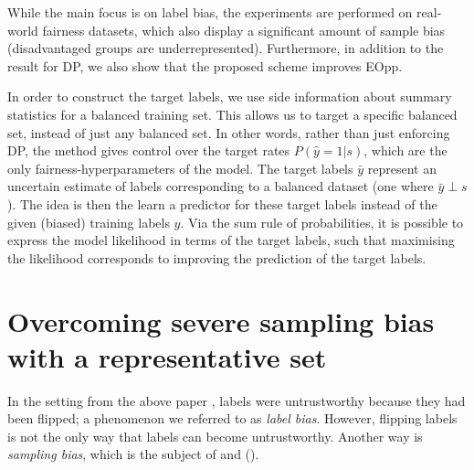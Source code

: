 While the main focus is on label bias,
the experiments are performed on real-world fairness datasets,
which also display a significant amount of sample bias (disadvantaged groups are underrepresented).
Furthermore, in addition to the result for \ac{DP}, we also show that the proposed scheme improves \acf{EOpp}.

In order to construct the target labels,
we use side information about summary statistics for a balanced training set.
This allows us to target a specific balanced set, instead of just any balanced set.
In other words, rather than just enforcing \ac{DP}, the method gives control over the target rates \(P(\hat{y}=1|s)\),
which are the only fairness-hyperparameters of the model.
The target labels \(\bar{y}\) represent an uncertain estimate of labels corresponding to a balanced dataset
(one where \(\bar{y} \perp s\)).
The idea is then the learn a predictor for these target labels instead of the given (biased) training labels \(y\).
Via the sum rule of probabilities, it is possible to express the model likelihood in terms of the target labels,
such that maximising the likelihood corresponds to improving the prediction of the target labels.

\section{Overcoming severe sampling bias with a representative set}\label{sec:nifr}
In the setting from the above paper \citep{kehrenberg2020tuning},
labels were untrustworthy because they had been flipped;
a phenomenon we referred to as \emph{label bias}.
However, flipping labels is not the only way that labels can become untrustworthy.
Another way is \emph{sampling bias}, which is the subject of \citet{kehrenberg2020nullsampling} and \citet{kehrenberg2020zeroshot} ().

